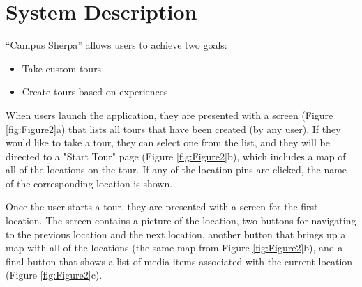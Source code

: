 \documentclass{sigchi}
\begin{document}
\section{System Description}

``Campus Sherpa'' allows users to achieve two goals: 

\begin{itemize}
	\item Take custom tours
	\item Create tours based on experiences.
\end{itemize}

When users launch the application, they are presented with a screen (Figure \ref{fig:Figure2}a) that lists all tours that have been created (by any user). If they would like to take a tour, they can select one from the list, and they will be directed to a "Start Tour" page (Figure \ref{fig:Figure2}b), which includes a map of all of the locations on the tour. If any of the location pins are clicked, the name of the corresponding location is shown.

Once the user starts a tour, they are presented with a screen for the first location. The screen contains a picture of the location, two buttons for navigating to the previous location and the next location, another button that brings up a map with all of the locations (the same map from Figure \ref{fig:Figure2}b), and a final button that shows a list of media items associated with the current location (Figure \ref{fig:Figure2}c).
\end{document}
